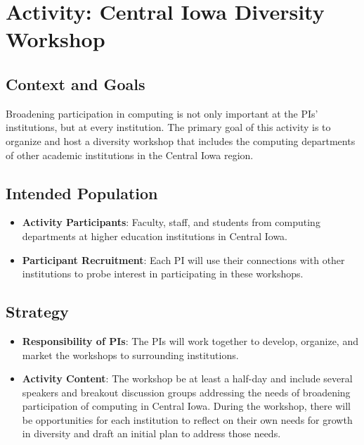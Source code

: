 \documentclass[11pt]{article}
\begin{document}
    \section{Activity: Central Iowa Diversity Workshop}
    \subsection{Context and Goals}
    Broadening participation in computing is not only important at the PIs' institutions, but at every institution.
    The primary goal of this activity is to organize and host a diversity workshop that includes the computing departments of other academic institutions in the Central Iowa region.

    \subsection{Intended Population}
    \begin{itemize}
    	\item 
    	\textbf{Activity Participants}: Faculty, staff, and students from computing departments at higher education institutions in Central Iowa.
    	
    	\item 
    	\textbf{Participant Recruitment}: Each PI will use their connections with other institutions to probe interest in participating in these workshops.
    \end{itemize}

    \subsection{Strategy}

    \begin{itemize}
    	\item 
    	\textbf{Responsibility of PIs}: The PIs will work together to develop, organize, and market the workshops to surrounding institutions.
    	
    	\item 
    	\textbf{Activity Content}:
    	The workshop be at least a half-day and include several speakers and breakout discussion groups addressing the needs of broadening participation of computing in Central Iowa.
        During the workshop, there will be opportunities for each institution to reflect on their own needs for growth in diversity and draft an initial plan to address those needs.

    \end{itemize}
\end{document}
